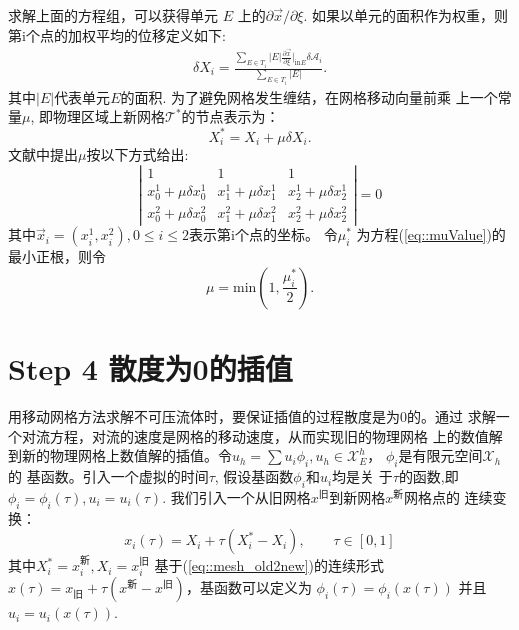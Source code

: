\documentclass{report}
\theoremstyle{Remark}
\begin{document}
  求解上面的方程组，可以获得单元 $E$ 上的$\partial \vec{x} / \partial
  \xi$. 如果以单元的面积作为权重，则第i个点的加权平均的位移定义如下:
  \begin{eqnarray}
    \delta X_i = \frac{\sum\limits_{E \in T_i} |E| \frac{\partial
        \vec{x}}{\partial \xi}|_{\text{in} E} \delta
      \mathcal{A}_i}{\sum\limits_{E \in T_i} |E|}.
  \end{eqnarray}
  其中$|E|$代表单元$E$的面积. 为了避免网格发生缠结，在网格移动向量前乘
  上一个常量$\mu$, 即物理区域上新网格$\mathcal{T}^*$的节点表示为：
  \begin{equation}
    X_i^* = X_i + \mu \delta X_i.
  \end{equation}
  文献\cite{di2005moving}中提出$\mu$按以下方式给出:
  \begin{equation}
    \left | 
      \begin{array}{ccc}
        1 & 1 & 1 \\
        x_0^1 + \mu \delta x_0^1 & x_1^1 + \mu \delta x_1^1 & x_2^1 +
        \mu \delta x_2^1 \\
        x_0^2 + \mu \delta x_0^2 & x_1^2 + \mu \delta x_1^2 & x_2^2 +
        \mu \delta x_2 ^2 
      \end{array}
    \right | = 0
    \label{eq::muValue}
  \end{equation}
  其中$ \vec{x}_i = (x_i^1, x_i^2), 0 \leq i \leq 2$表示第i个点的坐标。
  令$\mu_i^*$ 为方程(\ref{eq::muValue})的最小正根，则令
  \begin{equation}
    \mu = \text{min} (1, \frac{\mu_i^*}{2}).
  \end{equation}
 
  \section{Step 4 散度为0的插值}
    用移动网格方法求解不可压流体时，要保证插值的过程散度是为0的。通过
    求解一个对流方程，对流的速度是网格的移动速度，从而实现旧的物理网格
    上的数值解到新的物理网格上数值解的插值。令$u_h = \sum u_i \phi_i,
    u_h \in \mathcal{X}_E^h$， $\phi_i$是有限元空间$\mathcal{X}_h$的
    基函数。引入一个虚拟的时间$\tau$, 假设基函数$\phi_i$和$u_i$均是关
    于$\tau$的函数,即$\phi_i = \phi_i(\tau), u_i = u_i(\tau)$.
    我们引入一个从旧网格$x^{\text{旧}}$到新网格$x^{\text{新}}$网格点的
    连续变换：
    \begin{equation}
       x_i(\tau) = X_i + \tau (X_i^* - X_i), \qquad \tau \in [0, 1]
       \label{eq::mesh_old2new}
    \end{equation}
    其中$X_i^* = x_i^{\text{新}}, X_i = x_i^{\text{旧}}$
    基于(\ref{eq::mesh_old2new})的连续形式$x(\tau) = x_{\text{旧}} +
    \tau (x^{\text{新}} - x^{\text{旧}})$，基函数可以定义为
    $\phi_i(\tau) = \phi_i(x(\tau))$ 并且 $u_i = u_i(x(\tau))$.
    
\end{document}
